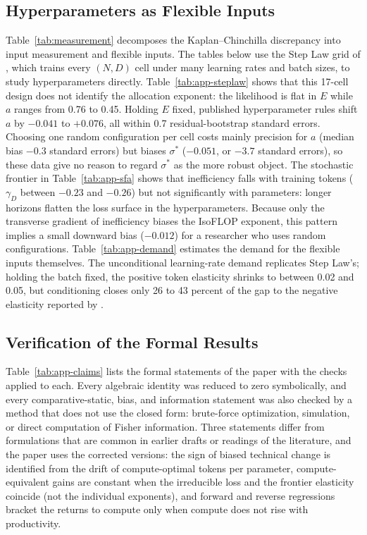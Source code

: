 \subsection{Hyperparameters as Flexible Inputs}\label{app:add-flexible}

Table~\ref{tab:measurement} decomposes the Kaplan--Chinchilla discrepancy into input measurement and flexible inputs.
The tables below use the Step Law grid of \citet{li2025predictablea}, which trains every $(N,D)$ cell under many
learning rates and batch sizes, to study hyperparameters directly. Table~\ref{tab:app-steplaw} shows that this
17-cell design does not identify the allocation exponent: the likelihood is flat in $E$ while $a$ ranges from 0.76 to
0.45. Holding $E$ fixed, published hyperparameter rules shift $a$ by $-0.041$ to $+0.076$, all within 0.7
residual-bootstrap standard errors. Choosing one random configuration per cell costs mainly precision for $a$ (median
bias $-0.3$ standard errors) but biases $\sigma^*$ ($-0.051$, or $-3.7$ standard errors), so these data give no reason
to regard $\sigma^*$ as the more robust object. The stochastic frontier in Table~\ref{tab:app-sfa} shows that
inefficiency falls with training tokens ($\gamma_D$ between $-0.23$ and $-0.26$) but not significantly with
parameters: longer horizons flatten the loss surface in the hyperparameters. Because only the transverse gradient of
inefficiency biases the IsoFLOP exponent, this pattern implies a small downward bias ($-0.012$) for a researcher who
uses random configurations. Table~\ref{tab:app-demand} estimates the demand for the flexible inputs themselves. The
unconditional learning-rate demand replicates Step Law's; holding the batch fixed, the positive token elasticity
shrinks to between 0.02 and 0.05, but conditioning closes only 26 to 43 percent of the gap to the negative elasticity
reported by \citet{bjorck2024scaling}.





\clearpage

\subsection{Verification of the Formal Results}\label{app:add-claims}

Table~\ref{tab:app-claims} lists the formal statements of the paper with the checks applied to each. Every algebraic
identity was reduced to zero symbolically, and every comparative-static, bias, and information statement was also
checked by a method that does not use the closed form: brute-force optimization, simulation, or direct computation of
Fisher information. Three statements differ from formulations that are common in earlier drafts or readings of the
literature, and the paper uses the corrected versions: the sign of biased technical change is identified from the drift
of compute-optimal tokens per parameter, compute-equivalent gains are constant when the irreducible loss and the
frontier elasticity coincide (not the individual exponents), and forward and reverse regressions bracket the returns to
compute only when compute does not rise with productivity.



\clearpage

